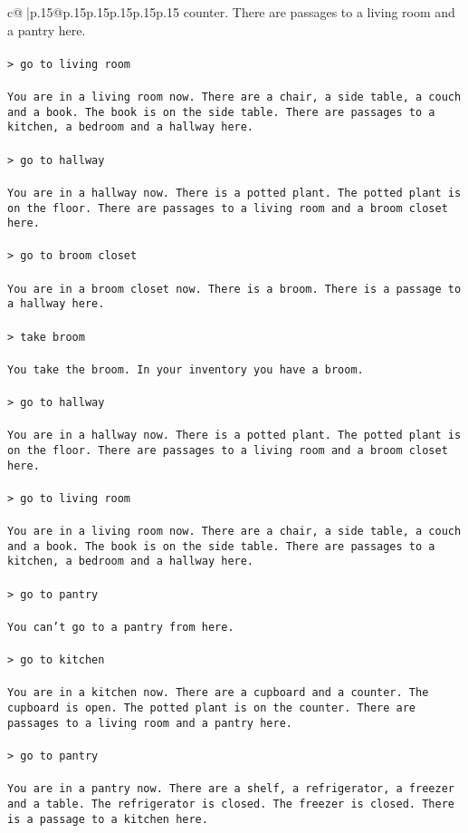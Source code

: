 \documentclass{article}
\begin{document}
{\begin{supertabular}{c@{$\;$}|p{.15\linewidth}@{}p{.15\linewidth}p{.15\linewidth}p{.15\linewidth}p{.15\linewidth}p{.15\linewidth}}
{{{counter. There are passages to a living room and a pantry here.\\ \tt \\ \tt > go to living room\\ \tt \\ \tt You are in a living room now. There are a chair, a side table, a couch and a book. The book is on the side table. There are passages to a kitchen, a bedroom and a hallway here.\\ \tt \\ \tt > go to hallway\\ \tt \\ \tt You are in a hallway now. There is a potted plant. The potted plant is on the floor. There are passages to a living room and a broom closet here.\\ \tt \\ \tt > go to broom closet\\ \tt \\ \tt You are in a broom closet now. There is a broom. There is a passage to a hallway here.\\ \tt \\ \tt > take broom\\ \tt \\ \tt You take the broom. In your inventory you have a broom.\\ \tt \\ \tt > go to hallway\\ \tt \\ \tt You are in a hallway now. There is a potted plant. The potted plant is on the floor. There are passages to a living room and a broom closet here.\\ \tt \\ \tt > go to living room\\ \tt \\ \tt You are in a living room now. There are a chair, a side table, a couch and a book. The book is on the side table. There are passages to a kitchen, a bedroom and a hallway here.\\ \tt \\ \tt > go to pantry\\ \tt \\ \tt You can't go to a pantry from here.\\ \tt \\ \tt > go to kitchen\\ \tt \\ \tt You are in a kitchen now. There are a cupboard and a counter. The cupboard is open. The potted plant is on the counter. There are passages to a living room and a pantry here.\\ \tt \\ \tt > go to pantry\\ \tt \\ \tt You are in a pantry now. There are a shelf, a refrigerator, a freezer and a table. The refrigerator is closed. The freezer is closed. There is a passage to a kitchen here.\\ }}}
\end{supertabular}}
\end{document}
